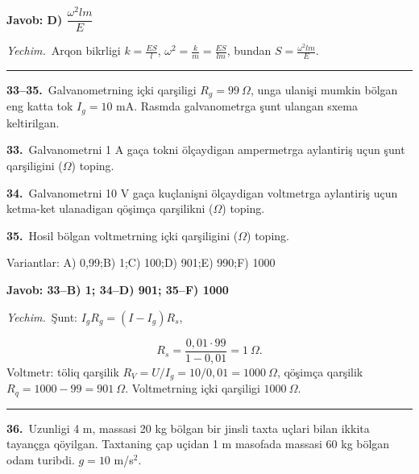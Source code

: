 \documentclass[11pt,a4paper]{article}
\begin{document}
\noindent\colorbox{gray!12}{\parbox{\dimexpr\linewidth-2\fboxsep}{\textbf{Javob: D) $\dfrac{\omega^2lm}{E}$}}}\par\smallskip
\noindent\textit{Yechim.}\ Arqon bikrligi $k=\frac{ES}{l}$, $\omega^2=\frac{k}{m}=\frac{ES}{lm}$, bundan $S=\frac{\omega^2lm}{E}$.\par\par\medskip\hrule\medskip
\newpage\noindent\textbf{33–35.}\ Galvanometrning içki qarşiligi $R_g=99\ \Omega$, unga ulanişi mumkin bölgan eng katta tok $I_g=10$ mA. Rasmda galvanometrga şunt ulangan sxema keltirilgan.\par\medskip
\begin{center}\end{center}
\noindent\textbf{33.}\ Galvanometrni 1 A gaça tokni ölçaydigan ampermetrga aylantiriş uçun şunt qarşiligini ($\Omega$) toping.\par
\noindent\textbf{34.}\ Galvanometrni 10 V gaça kuçlanişni ölçaydigan voltmetrga aylantiriş uçun ketma-ket ulanadigan qöşimça qarşilikni ($\Omega$) toping.\par
\noindent\textbf{35.}\ Hosil bölgan voltmetrning içki qarşiligini ($\Omega$) toping.\par
\noindent Variantlar: A) 0,99;\quad B) 1;\quad C) 100;\quad D) 901;\quad E) 990;\quad F) 1000\par\smallskip
\noindent\colorbox{gray!12}{\parbox{\dimexpr\linewidth-2\fboxsep}{\textbf{Javob: 33--B) 1; 34--D) 901; 35--F) 1000}}}\par\smallskip
\noindent\textit{Yechim.}\ Şunt: $I_gR_g=(I-I_g)R_s$,\par
\[R_s=\frac{0{,}01\cdot99}{1-0{,}01}=1\ \Omega.\]
Voltmetr: töliq qarşilik $R_V=U/I_g=10/0{,}01=1000\ \Omega$, qöşimça qarşilik $R_q=1000-99=901\ \Omega$. Voltmetrning içki qarşiligi $1000\ \Omega$.\par\par\medskip\hrule\medskip
{}\noindent\textbf{36.}\ Uzunligi 4 m, massasi 20 kg bölgan bir jinsli taxta uçlari bilan ikkita tayançga qöyilgan. Taxtaning çap uçidan 1 m masofada massasi 60 kg bölgan odam turibdi. $g=10$ m/s$^2$.\par
\end{document}
